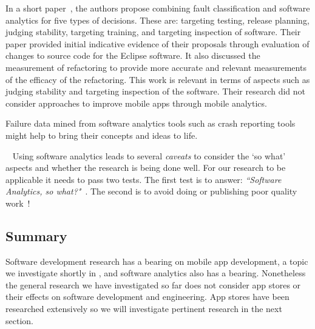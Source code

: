 In a short paper~, the authors propose combining fault classification and software analytics for five types of decisions. These are: targeting testing, release planning, judging stability, targeting training, and targeting inspection of software. Their paper provided initial indicative evidence of their proposals through evaluation of changes to source code for the Eclipse software. It also discussed the measurement of refactoring to provide more accurate and relevant measurements of the efficacy of the refactoring. This work is relevant in terms of aspects such as judging stability and targeting inspection of the software. Their research did not consider approaches to improve mobile apps through mobile analytics. 

Failure data mined from software analytics tools such as crash reporting tools might help to bring their concepts and ideas to life.

{}~\label{rw-caveats-with-software-analytics-topic}
Using software analytics leads to several \emph{caveats} to consider the `so what' aspects and whether the research is being done well. For our research to be applicable it needs to pass two tests. The first test is to answer: 
\emph{``Software Analytics, so what?"}~. The second is to avoid doing or publishing poor quality work~!


\subsection{Summary}
Software development research has a bearing on mobile app development, a topic we investigate shortly in , and software analytics also has a bearing. Nonetheless the general research we have investigated so far does not consider app stores or their effects on software development and engineering. App stores have been researched extensively so we will investigate pertinent research in the next section.



